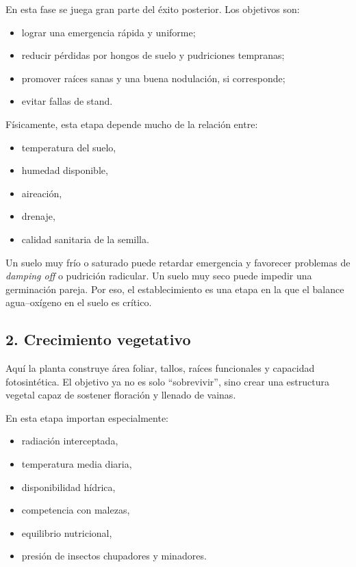 \documentclass[11pt,a4paper]{article}
\begin{document}
En esta fase se juega gran parte del éxito posterior. Los objetivos son:

\begin{itemize}[leftmargin=1.5em]
    \item lograr una emergencia rápida y uniforme;
    \item reducir pérdidas por hongos de suelo y pudriciones tempranas;
    \item promover raíces sanas y una buena nodulación, si corresponde;
    \item evitar fallas de stand.
\end{itemize}

Físicamente, esta etapa depende mucho de la relación entre:
\begin{itemize}[leftmargin=1.5em]
    \item temperatura del suelo,
    \item humedad disponible,
    \item aireación,
    \item drenaje,
    \item calidad sanitaria de la semilla.
\end{itemize}

Un suelo muy frío o saturado puede retardar emergencia y favorecer problemas de \emph{damping off} o pudrición radicular. Un suelo muy seco puede impedir una germinación pareja. Por eso, el establecimiento es una etapa en la que el balance agua--oxígeno en el suelo es crítico.

\subsection{2. Crecimiento vegetativo}

Aquí la planta construye área foliar, tallos, raíces funcionales y capacidad fotosintética. El objetivo ya no es solo \enquote{sobrevivir}, sino crear una estructura vegetal capaz de sostener floración y llenado de vainas.

En esta etapa importan especialmente:
\begin{itemize}[leftmargin=1.5em]
    \item radiación interceptada,
    \item temperatura media diaria,
    \item disponibilidad hídrica,
    \item competencia con malezas,
    \item equilibrio nutricional,
    \item presión de insectos chupadores y minadores.
\end{itemize}
\end{document}
